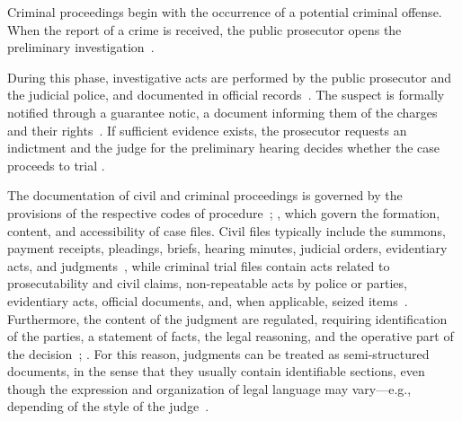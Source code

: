 
Criminal proceedings begin with the occurrence of a potential criminal offense. When the report of a crime is received, the public prosecutor opens the preliminary investigation~\cite[Art.~326]{CPP}.

During this phase, investigative acts are performed by the public prosecutor and the judicial police, and documented in official records~\cite[Art.~373]{CPP}. The suspect is formally notified through a guarantee notic, a document informing them of the charges and their rights~\cite[Art.~369]{CPP}. If sufficient evidence exists, the prosecutor requests an indictment and the judge for the preliminary hearing decides whether the case proceeds to trial \cite[Art.~416]{CPP}.


The documentation of civil and criminal proceedings is governed by the provisions of the respective codes of procedure~\cite[Art.~168--169]{CPC}; \cite[Art.~431, 114]{CPP}, which govern the formation, content, and accessibility of case files.
Civil files typically include the summons, payment receipts, pleadings, briefs, hearing minutes, judicial orders, evidentiary acts, and judgments~\cite[Art.~168]{CPC}, while criminal trial files contain acts related to prosecutability and civil claims, non-repeatable acts by police or parties, evidentiary acts, official documents, and, when applicable, seized items~\cite[Art.~431]{CPP}.
Furthermore, the content of the judgment are regulated, requiring identification of the parties, a statement of facts, the legal reasoning, and the operative part of the decision~\cite[Art.~546]{CPP}; \cite[Art.~132]{CPC}. For this reason, judgments can be treated as semi-structured documents, in the sense that they usually contain identifiable sections, even though the expression and organization of legal language may vary---e.g., depending of the style of the judge~\cite{juliahb2024,galli2025analisi,pont2023legalsummarisationllmsprodigit}.

